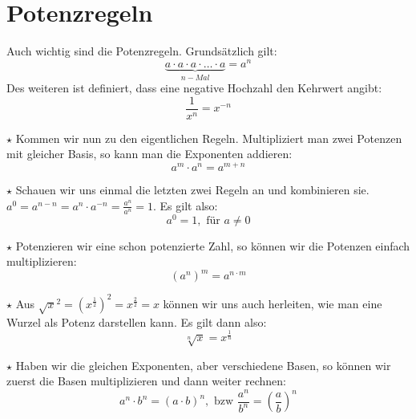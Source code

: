 \section{Potenzregeln}
	Auch wichtig sind die Potenzregeln. Grundsätzlich gilt:
	\[\underbrace{a\cdot a\cdot a\cdot\ldots\cdot a}_{n-Mal}=a^n\]
	Des weiteren ist definiert, dass eine negative Hochzahl den Kehrwert angibt:
	\[\frac{1}{x^n}=x^{-n}\]
	
	\(\star\) Kommen wir nun zu den eigentlichen Regeln. Multipliziert man zwei
	Potenzen mit gleicher Basis, so kann man die Exponenten addieren:
	\[a^m\cdot a^n=a^{m+n}\]
	
	\(\star\) Schauen wir uns einmal die letzten zwei Regeln an und kombinieren
	sie. \(a^0=a^{n-n}=a^n\cdot a^{-n}=\frac{a^n}{a^n}=1\). Es gilt also:
	\[a^0=1,\text{ für }a\neq 0\]
	
	\(\star\) Potenzieren wir eine schon potenzierte
	Zahl, so können wir die Potenzen einfach multiplizieren:
	\[\left ( a^n \right )^m=a^{n\cdot m}\]
	
	\(\star\) Aus \(\sqrt{x}^2=\left ( x^{\frac{1}{2}}\right
	)^2=x^{\frac{2}{2}}=x\) können wir uns auch herleiten, wie man eine Wurzel als
	Potenz darstellen kann. Es gilt dann also:
	\[\sqrt[n]{x}=x^{\frac{1}{n}}\]
	
	\(\star\) Haben wir die gleichen Exponenten, aber verschiedene Basen, so können
	wir zuerst die Basen multiplizieren und dann weiter rechnen:
	\[a^n\cdot b^n=(a\cdot b)^n, \textrm{\ bzw\ } \frac{a^n}{b^n}=\left (
	\frac{a}{b}\right ) ^n\]

